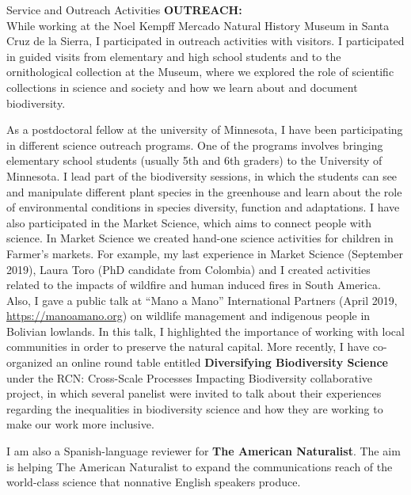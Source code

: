 \documentclass{resume} %
\begin{document}
\begin{rSection}{Service and Outreach Activities}
\textbf{OUTREACH:} \smallskip \\ 
While working at the Noel Kempff Mercado Natural History Museum in Santa Cruz de la Sierra, I participated in outreach activities with visitors. I participated in guided visits from elementary and high school students and to the ornithological collection at the Museum, where we explored the role of scientific collections in science and society and how we learn about and document biodiversity.

As a postdoctoral fellow at the university of Minnesota, I have been participating in different science outreach programs. One of the programs involves bringing elementary school students (usually 5th and 6th graders) to the University of Minnesota. I lead part of the biodiversity sessions, in which the students can see and manipulate different plant species in the greenhouse and learn about the role of environmental conditions in species diversity, function and adaptations. I have also participated in the Market Science, which aims to connect people with science. In Market Science we created hand-one science activities for children in Farmer’s markets. For example, my last experience in Market Science (September 2019), Laura Toro (PhD candidate from Colombia) and I created activities related to the impacts of wildfire and human induced fires in South America. Also, I gave a public talk at “Mano a Mano” International Partners (April 2019, \url{https://manoamano.org}) on wildlife management and indigenous people in Bolivian lowlands. In this talk, I highlighted the importance of working with local communities in order to preserve the natural capital. More recently, I have co-organized an online round table entitled {\bf Diversifying Biodiversity Science} under the RCN: Cross-Scale Processes Impacting Biodiversity collaborative project, in which several panelist were invited to talk about their experiences regarding the inequalities in biodiversity science and how they are working to make our work more inclusive.

I am also a Spanish-language reviewer for {\bf The American Naturalist}. The aim is helping The American Naturalist to expand the communications reach of the world-class science that nonnative English speakers produce.


\end{rSection}

\end{document}
